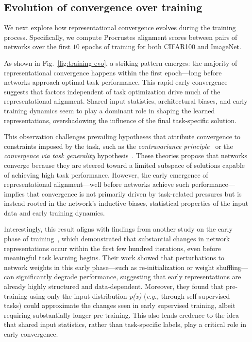 \subsection{Evolution of convergence over training}
We next explore how representational convergence evolves during the training process. Specifically, we compute Procrustes alignment scores between pairs of networks over the first $10$ epochs of training for both CIFAR100 and ImageNet.



As shown in Fig.~\ref{fig:training-evo}, a striking pattern emerges: the majority of representational convergence happens within the first epoch---long before networks approach optimal task performance. This rapid early convergence suggests that factors independent of task optimization drive much of the representational alignment. Shared input statistics, architectural biases, and early training dynamics seem to play a dominant role in shaping the learned representations, overshadowing the influence of the final task-specific solution.

This observation challenges prevailing hypotheses that attribute convergence to constraints imposed by the task, such as the \emph{contravariance principle}~\citep{cao2021explanatory} or the \emph{convergence via task generality} hypothesis~\citep{huh2024platonic}. These theories propose that networks converge because they are steered toward a limited subspace of solutions capable of achieving high task performance. However, the early emergence of representational alignment---well before networks achieve such performance---implies that convergence is not primarily driven by task-related pressures but is instead rooted in the network’s inductive biases, statistical properties of the input data and early training dynamics.

Interestingly, this result aligns with findings from another study on the early phase of training~\citep{frankle2020early}, which demonstrated that substantial changes in network representations occur within the first few hundred iterations, even before meaningful task learning begins. Their work showed that perturbations to network weights in this early phase---such as re-initialization or weight shuffling---can significantly degrade performance, suggesting that early representations are already highly structured and data-dependent. Moreover, they found that pre-training using only the input distribution \emph{p(x)} (\emph{e.g.,} through self-supervised tasks) could approximate the changes seen in early supervised training, albeit requiring substantially longer pre-training. This also lends credence to the idea that shared input statistics, rather than task-specific labels, play a critical role in early convergence.


